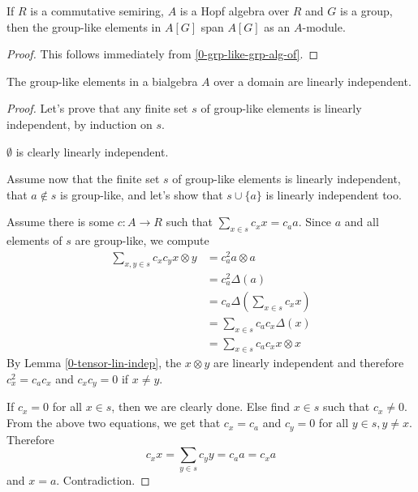 \begin{lemma}
  \label{0-grp-like-grp-alg-span}
  \leanok

  If $R$ is a commutative semiring, $A$ is a Hopf algebra over $R$ and
  $G$ is a group, then the group-like elements in $A[G]$ span $A[G]$ as
  an $A$-module.

\end{lemma}
\begin{proof}
  \leanok

  This follows immediately from \ref{0-grp-like-grp-alg-of}.
\end{proof}


\begin{lemma}
  \label{0-grp-like-lin-indep}
  \leanok

  The group-like elements in a bialgebra $A$ over a domain are linearly independent.
\end{lemma}
\begin{proof}
  \leanok

  Let's prove that any finite set $s$ of group-like elements is linearly independent, by induction on $s$.

  $\emptyset$ is clearly linearly independent.

  Assume now that the finite set $s$ of group-like elements is linearly independent, that $a \notin s$ is group-like, and let's show that $s \cup \{a\}$ is linearly independent too.

  Assume there is some $c : A \to R$ such that $\sum_{x \in s} c_x x = c_a a$.
  Since $a$ and all elements of $s$ are group-like, we compute
  \begin{align*}
    \sum_{x, y \in s} c_x c_y x \otimes y
    & = c_a ^ 2 a \otimes a \\
    & = c_a ^ 2 \Delta(a) \\
    & = c_a \Delta\left(\sum_{x \in s} c_x x\right) \\
    & = \sum_{x \in s} c_a c_x \Delta(x) \\
    & = \sum_{x \in s} c_a c_x x \otimes x
  \end{align*}
  By Lemma \ref{0-tensor-lin-indep}, the $x \otimes y$ are linearly independent and therefore $c_x ^ 2 = c_a c_x$ and $c_x c_y = 0$ if $x \ne y$.

  If $c_x = 0$ for all $x \in s$, then we are clearly done.
  Else find $x \in s$ such that $c_x \ne 0$.
  From the above two equations, we get that $c_x = c_a$ and $c_y = 0$ for all $y \in s, y \ne x$.
  Therefore
  \[c_x x = \sum_{y \in s} c_y y = c_a a = c_x a\]
  and $x = a$.
  Contradiction.
\end{proof}


